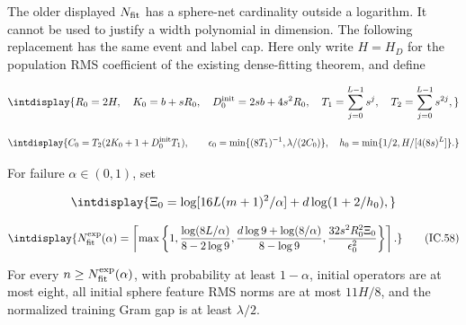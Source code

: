 \mbox{}\par\smallskip


The older displayed \(N_{\rm fit}\) has a sphere-net cardinality outside a logarithm. It cannot be used to justify a width polynomial in dimension. The following replacement has the same event and label cap. Here only write \(H=H_D\) for the population RMS coefficient of the existing dense-fitting theorem, and define


\begingroup\renewcommand{\theHequation}{intdisplay.644}
\begin{equation*}
\intdisplay{
R_0=2H,\quad K_0=b+sR_0,\quad D_0^{\rm init}=2sb+4s^2R_0,
 \quad T_1=\sum_{j=0}^{L-1}s^j,\quad T_2=\sum_{j=0}^{L-1}s^{2j},
}
\end{equation*}
\endgroup

\begingroup\renewcommand{\theHequation}{intdisplay.645}
\begin{equation*}
\intdisplay{
C_0=T_2(2K_0+1+D_0^{\rm init}T_1),\qquad
 \epsilon_0=\min\{(8T_1)^{-1},\lambda/(2C_0)\},
 \quad h_0=\min\{1/2,H/[4(8s)^L]\}.
}
\end{equation*}
\endgroup


For failure \(\alpha\in(0,\allowbreak 1)\), set


\begingroup\renewcommand{\theHequation}{intdisplay.646}
\begin{equation*}
\intdisplay{
\Xi_0=\log[16L(m+1)^2/\alpha]+d\log(1+2/h_0),
}
\end{equation*}
\endgroup

\begingroup\renewcommand{\theHequation}{intdisplay.647}
\begin{equation}
\intdisplay{
N_{\rm fit}^{\rm exp}(\alpha)=\left\lceil\max\left\{
 1,\frac{\log(8L/\alpha)}{8-2\log9},
 \frac{d\log9+\log(8/\alpha)}{8-\log9},
 \frac{32s^2R_0^2\Xi_0}{\epsilon_0^2}\right\}\right\rceil.
}
\tag{IC.58}
\label{int:eq-0273-ic-58}
\end{equation}
\endgroup


For every \(n\ge N_{\rm fit}^{\rm exp}(\alpha)\), with probability at least \(1-\alpha\), initial operators are at most eight, all initial sphere feature RMS norms are at most \(11H/8\), and the normalized training Gram gap is at least \(\lambda/2\).


